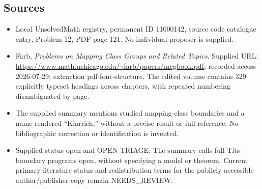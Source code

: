 \documentclass[11pt]{article}
\begin{document}
\subsection{Sources}
\begin{itemize}
\item Local UnsolvedMath registry, permanent ID 11000142, source code catalogue entry, Problem 12, PDF page 121. No individual proposer is supplied.
\item Farb, \emph{Problems on Mapping Class Groups and Related Topics}. Supplied URL: \url{https://www.math.uchicago.edu/~farb/papers/mcgbook.pdf}; recorded access 2026-07-29; extraction pdf-font-structure. The edited volume contains 329 explicitly typeset headings across chapters, with repeated numbering disambiguated by page.
\item The supplied summary mentions studied mapping-class boundaries and a name rendered ``Klarrich,'' without a precise result or full reference. No bibliographic correction or identification is invented.
\item Supplied status open and OPEN-TRIAGE. The summary calls full Tits-boundary programs open, without specifying a model or theorem. Current primary-literature status and redistribution terms for the publicly accessible author/publisher copy remain NEEDS\_REVIEW.
\end{itemize}
\end{document}
